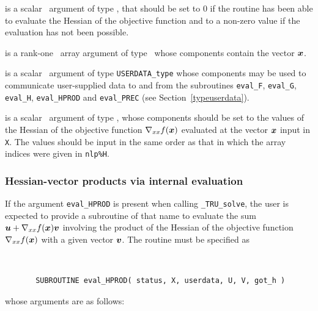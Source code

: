 \documentclass{galahad}
\newcommand{\packagename}{TRU}
\newcommand{\fullpackagename}{\libraryname\_\packagename}
\newcommand{\solver}{{\tt \fullpackagename\_solve}}
\begin{document}
\begin{description}
 is a scalar \intentout\ argument of type \integer,
that should be set to 0 if the routine has been able to evaluate
the Hessian of the objective function
and to a non-zero value if the evaluation has not been possible.

 is a rank-one \intentin\ array argument of type \realdp\
whose components contain the vector ${\bm{x}}$.

 is a scalar \intentinout\ argument of type
{\tt USERDATA\_type} whose components may be used
to communicate user-supplied data to and from the
subroutines {\tt eval\_F}, {\tt eval\_G},
{\tt eval\_H}, {\tt eval\_HPROD} and {\tt eval\_PREC}
(see Section~\ref{typeuserdata}).

 is a scalar \intentout\ argument of type \realdp,
whose components should be set to the values of the Hessian
of the objective function $\nabla_{xx} f({\bm{x}})$
evaluated at the vector ${\bm{x}}$ input in {\tt X}. The values should
be input in the same order as that in which the array indices were
given in {\tt nlp\%H}.

\end{description}


\subsubsection{Hessian-vector products via internal evaluation\label{hvfv}}

If the argument {\tt eval\_HPROD} is present when calling \solver, the
user is expected to provide a subroutine of that name to evaluate the
sum ${\bm{u}} + \nabla_{xx} f({\bm{x}}) {\bm{v}}$ involving the
product of the Hessian of the objective function $\nabla_{xx} f({\bm{x}})$
with a given vector ${\bm{v}}$.
The routine must be specified as

\def\baselinestretch{0.8}
{\tt
\begin{verbatim}
       SUBROUTINE eval_HPROD( status, X, userdata, U, V, got_h )
\end{verbatim} }
\def\baselinestretch{1.0}
\noindent whose arguments are as follows:
\end{document}
